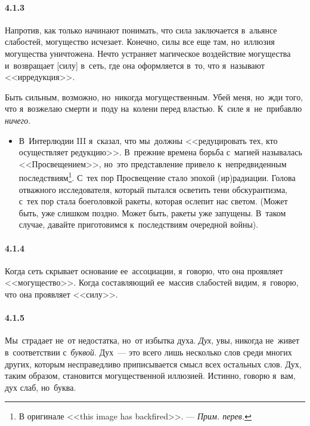 \paragraph{4.1.3}\hypertarget{par:4.1.3}{} Напротив, как только начинают понимать, что сила заключается в~альянсе слабостей, могущество исчезает. Конечно, силы все еще там, но~иллюзия могущества уничтожена. Нечто устраняет магическое воздействие могущества и~возвращает [силу] в~сеть, где она оформляется в~то, что я~называют <<ирредукция>>. 

Быть сильным, возможно, но~никогда могущественным. Убей меня, но~жди того, что я~возжелаю смерти и~поду на~колени перед властью. К~силе я~не~прибавлю {\itshape ничего}.

	\begin{itemize}
	\item 
 В~Интерлюдии III я~сказал, что мы~должны <<редуцировать тех, кто осуществляет редукцию>>. В~прежние времена борьба с~магией называлась <<Просвещением>>, но~это представление привело к~непредвиденным последствиям\footnote{В оригинале <<this image has backfired>>. --- {\itshape Прим. перев.}}. С~тех пор Просвещение стало эпохой (ир)радиации. Голова отважного исследователя, который пытался осветить тени обскурантизма, с~тех пор стала боеголовкой ракеты, которая ослепит нас светом. (Может быть, уже слишком поздно. Может быть, ракеты уже запущены. В~таком случае, давайте приготовимся к~последствиям очередной войны).
	\end{itemize}	


\paragraph{4.1.4}\hypertarget{par:4.1.4}{} Когда сеть скрывает основание ее~ассоциации, я~говорю, что она проявляет <<могущество>>. Когда составляющий ее~массив слабостей видим, я~говорю, что она проявляет <<силу>>.


\paragraph{4.1.5}\hypertarget{par:4.1.5}{} Мы~страдает не~от недостатка, но~от избытка духа. {\itshape Дух}, увы, никогда не~живет в~соответствии с~{\itshape буквой}. Дух~--- это всего лишь несколько слов среди многих других, которым несправедливо приписывается смысл всех остальных слов. Дух, таким образом, становится могущественной иллюзией. Истинно, говорю я~вам, дух слаб, но~буква.

